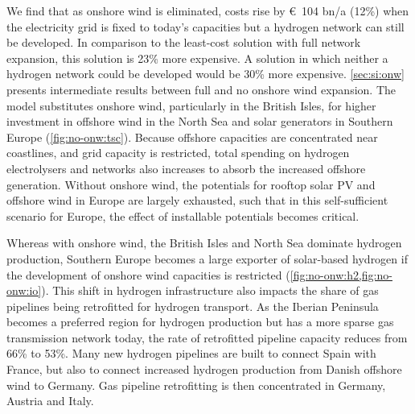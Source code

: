 We find that as onshore wind is eliminated, costs rise by \euro~104 bn/a (12\%)
when the electricity grid is fixed to today's capacities but a hydrogen network
can still be developed. In comparison to the least-cost solution with full
network expansion, this solution is 23\% more expensive. A solution in which
neither a hydrogen network could be developed would be 30\% more
expensive. \cref{sec:si:onw} presents intermediate results between full and no
onshore wind expansion. The model substitutes onshore wind, particularly in the
British Isles, for higher investment in offshore wind in the North Sea and solar
generators in Southern Europe (\cref{fig:no-onw:tsc}). Because offshore
capacities are concentrated near coastlines, and grid capacity is restricted,
total spending on hydrogen electrolysers and networks also increases to absorb
the increased offshore generation. Without onshore wind, the potentials for
rooftop solar PV and offshore wind in Europe are largely exhausted, such that in
this self-sufficient scenario for Europe, the effect of installable potentials
becomes critical.


Whereas with onshore wind, the British Isles and North Sea dominate hydrogen
production, Southern Europe becomes a large exporter of solar-based hydrogen if
the development of onshore wind capacities is restricted
(\cref{fig:no-onw:h2,fig:no-onw:io}). This shift in hydrogen infrastructure also
impacts the share of gas pipelines being retrofitted for hydrogen transport. As
the Iberian Peninsula becomes a preferred region for hydrogen production but has
a more sparse gas transmission network today, the rate of retrofitted pipeline
capacity reduces from 66\% to 53\%. Many new hydrogen pipelines are built to
connect Spain with France, but also to connect increased hydrogen production
from Danish offshore wind to Germany. Gas pipeline retrofitting is then
concentrated in Germany, Austria and Italy.
